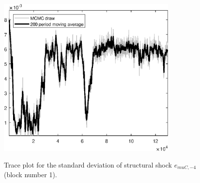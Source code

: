 \begin{figure}[H]
\centering
  \includegraphics[width=0.8\textwidth]{BRS_sectoral_wo_fixed_cost/graphs/TracePlot_SE_e_muC_news_blck_1}\\
    \caption{Trace plot for the standard deviation of structural shock ${e_{muC,-4}}$ (block number 1).}
\end{figure}
